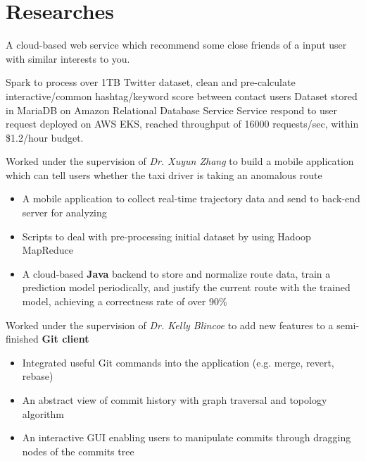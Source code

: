 \documentclass{resume}
\begin{document}
\section{Researches}
\begin{flushleft}
A cloud-based web service which recommend some close friends of a input user with similar interests to you.
\begin{itemize}
    \Use Spark to process over 1TB Twitter dataset, clean and pre-calculate interactive/common hashtag/keyword score between contact users
    \Processed Dataset stored in MariaDB on Amazon Relational Database Service
    \Web Service respond to user request deployed on AWS EKS, reached throughput of 16000 requests/sec, within \$1.2/hour budget.
\end{itemize}
Worked under the supervision of \textit{Dr. Xuyun Zhang} to build a mobile application which can tell users whether \linebreak the taxi driver is taking an anomalous route
\begin{itemize}
    \item A mobile application to collect real-time trajectory data and send to back-end server for analyzing
    \item Scripts to deal with pre-processing initial dataset by using Hadoop MapReduce
    \item A cloud-based \textbf{Java} backend to store and normalize route data, train a prediction model periodically, \linebreak and justify the current route with the trained model, achieving a correctness rate of over 90\%
\end{itemize}
Worked under the supervision of \textit{Dr. Kelly Blincoe} to add new features to a semi-finished \textbf{Git client}
\begin{itemize}
    \item Integrated useful Git commands into the application (e.g. merge, revert, rebase)
    \item An abstract view of commit history with graph traversal and topology algorithm
    \item An interactive GUI enabling users to manipulate commits through dragging nodes of the commits tree
\end{itemize}
\end{flushleft}
\end{document}
